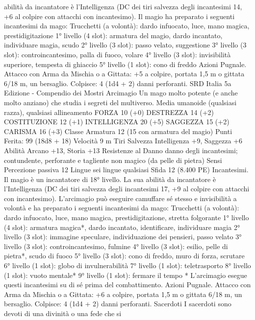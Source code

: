 \begin{multicols}{2}
abilità da incantatore è l’Intelligenza (DC dei tiri salvezza degli
incantesimi 14, +6 al colpire con attacchi con incantesimo). Il
magio ha preparato i seguenti incantesimi da mago:
Trucchetti (a volontà): dardo infuocato, luce, mano magica,
prestidigitazione
1° livello (4 slot): armatura del magio, dardo incantato,
individuare magia, scudo
2° livello (3 slot): passo velato, suggestione
3° livello (3 slot): controincantesimo, palla di fuoco, volare
4° livello (3 slot): invisibilità superiore, tempesta di ghiaccio
5° livello (1 slot): cono di freddo
Azioni
Pugnale. Attacco con Arma da Mischia o a Gittata: +5 a colpire,
portata 1,5 m o gittata 6/18 m, un bersaglio.
Colpisce: 4 (1d4 + 2) danni perforanti.
SRD Italia 5a Edizione - Compendio dei Mostri
Arcimagio
Un mago molto potente (e anche molto anziano) che
studia i segreti del multiverso.
Media umanoide (qualsiasi razza), qualsiasi allineamento
FORZA 10 (+0)
DESTREZZA 14 (+2)
COSTITUZIONE 12 (+1)
INTELLIGENZA 20 (+5)
SAGGEZZA 15 (+2)
CARISMA 16 (+3)
Classe Armatura 12 (15 con armatura del magio)
\hspace*{0pt}\hfill{Punti Ferita}: 99 (18d8 + 18)
Velocità 9 m
Tiri Salvezza Intelligenza +9, Saggezza +6
Abilità Arcano +13, Storia +13
Resistenze al Danno danno degli incantesimi; contundente,
perforante e tagliente non magico (da pelle di pietra)
Sensi Percezione passiva 12
Lingue sei lingue qualsiasi
Sfida 12 (8.400 PE)
Incantesimi. Il magio è un incantatore di 18° livello. La sua
abilità da incantatore è l’Intelligenza (DC dei tiri salvezza degli
incantesimi 17, +9 al colpire con attacchi con incantesimo).
L’arcimagio può eseguire camuffare sé stesso e invisibilità a
volontà e ha preparato i seguenti incantesimi da mago:
Trucchetti (a volontà): dardo infuocato, luce, mano magica,
prestidigitazione, stretta folgorante
1° livello (4 slot): armatura magica*, dardo incantato,
identificare, individuare magia
2° livello (3 slot): immagine speculare, individuazione dei
pensieri, passo velato
3° livello (3 slot): controincantesimo, fulmine
4° livello (3 slot): esilio, pelle di pietra*, scudo di fuoco
5° livello (3 slot): cono di freddo, muro di forza, scrutare
6° livello (1 slot): globo di invulnerabilità
7° livello (1 slot): teletrasporto
8° livello (1 slot): vuoto mentale*
9° livello (1 slot): fermare il tempo
* L’arcimagio esegue questi incantesimi su di sé prima del
combattimento.
Azioni
Pugnale. Attacco con Arma da Mischia o a Gittata: +6 a colpire,
portata 1,5 m o gittata 6/18 m, un bersaglio.
Colpisce: 4 (1d4 + 2) danni perforanti.
Sacerdoti
I sacerdoti sono devoti di una divinità o una fede che si

\end{multicols}
